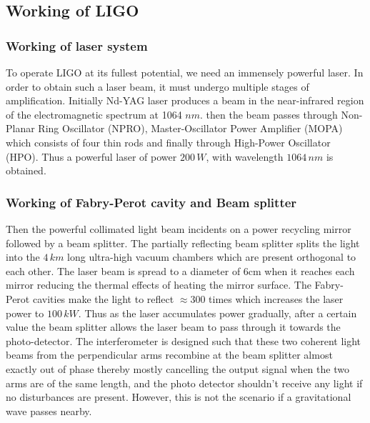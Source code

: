 \subsection{Working of LIGO}

\subsubsection{Working of laser system}

To operate LIGO at its fullest potential, we need an immensely powerful laser. In order to obtain such a laser beam, it must undergo multiple stages of amplification. Initially Nd-YAG laser produces a beam in the near-infrared region of the electromagnetic spectrum at 1064 $nm$. then the beam passes through Non-Planar Ring Oscillator (NPRO), Master-Oscillator Power Amplifier (MOPA) which consists of four thin rods and finally through High-Power Oscillator (HPO). Thus a powerful laser of power $200\,W$, with wavelength $1064\,nm$ is obtained. 

\subsubsection{Working of Fabry-Perot cavity and Beam splitter}

Then the powerful collimated light beam incidents on a power recycling mirror followed by a beam splitter. The partially reflecting beam splitter splits the light into the $4\,km$ long ultra-high vacuum chambers which are present orthogonal to each other. The laser beam is spread to a diameter of 6cm when it reaches each mirror reducing the thermal effects of heating the mirror surface. The Fabry-Perot cavities make the light to reflect $\approx 300$ times which increases the laser power to $100\,kW$. Thus as the laser accumulates power gradually, after a certain value the beam splitter allows the laser beam to pass through it towards the photo-detector. The interferometer is designed such that these two coherent light beams from the perpendicular arms recombine at the beam splitter almost exactly out of phase thereby mostly cancelling the output signal when the two arms are of the same length, and the photo detector shouldn't receive any light if no disturbances are present. However, this is not the scenario if a gravitational wave passes nearby. \cite{Interferometer}

